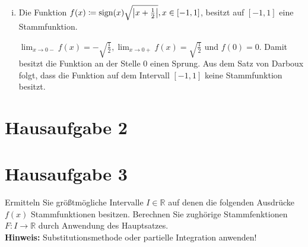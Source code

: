 \documentclass{article}
\begin{document}
\begin{enumerate}[(i)]
\item Die Funktion $f(x) \coloneqq \text{sign}(x) \sqrt{\abs{x + \frac{1}{2}}}, x \in [-1,1]$, besitzt
  auf $[-1,1]$ eine Stammfunktion.

  \label{dia:1.2}

  $\lim_{x \to 0-} f(x) = - \sqrt{\frac{1}{2}}, \lim_{x \to 0+} f(x) = \sqrt{\frac{1}{2}}$ und $f(0) = 0$.
  Damit besitzt die Funktion an der Stelle $0$ einen Sprung.
  Aus dem Satz von Darboux folgt, dass die Funktion auf dem Intervall $[-1, 1]$ keine Stammfunktion besitzt.
\end{enumerate}

\section*{Hausaufgabe 2}

\newpage
\section*{Hausaufgabe 3}

Ermitteln Sie größtmögliche Intervalle $I \in \mathbb{R}$ auf denen
die folgenden Ausdrücke $f(x)$ Stammfunktionen besitzen.
Berechnen Sie zughörige Stammfenktionen $F: I \to \mathbb{R}$ durch
Anwendung des Hauptsatzes. \\
\textbf{Hinweis:} Substitutionsmethode oder partielle Integration anwenden!
\end{document}
